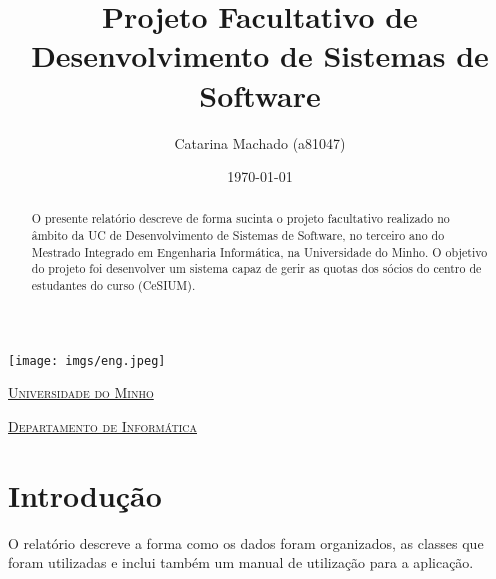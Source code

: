 \documentclass[a4paper]{article}
\begin{document}
\title{Projeto Facultativo de Desenvolvimento de Sistemas de Software}
\author{Catarina Machado (a81047)}
\date{\today}

\begin{titlepage}

  \thispagestyle{empty}
  \begin{center}
  \begin{minipage}{0.75\linewidth}
      \centering
      \texttt{[image: imgs/eng.jpeg]}\par\vspace{1cm}
      \vspace{1.5cm}
      \href{https://www.uminho.pt/PT}{\scshape\LARGE Universidade do Minho} \par
      \vspace{1cm}
      \href{https://www.di.uminho.pt/}{\scshape\Large Departamento de Informática} \par
      \vspace{1.5cm}

  \maketitle

  \end{minipage}
  \end{center}
  \clearpage

 \end{titlepage}


\begin{abstract}
O presente relatório descreve de forma sucinta o projeto facultativo realizado no âmbito da UC de Desenvolvimento de Sistemas de Software, no terceiro ano do Mestrado Integrado em Engenharia Informática, na Universidade do Minho.
O objetivo do projeto foi desenvolver um sistema capaz de gerir as quotas dos sócios do centro de estudantes do curso (CeSIUM).
\end{abstract}
\pagebreak

\tableofcontents


\pagebreak

\section{Introdução}
\label{sec:intro}

O relatório descreve a forma como os dados foram organizados, as classes que foram utilizadas e inclui também um manual de utilização para a aplicação.
\end{document}
